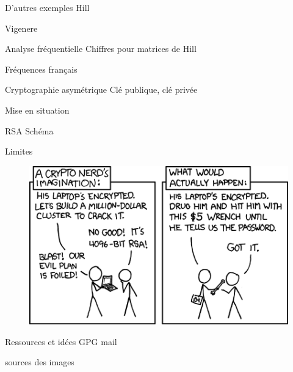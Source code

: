 \documentclass{beamer}
\begin{document}
\begin{frame}{D'autres exemples}
  Hill

  Vigenere
  \end{frame}

\begin{frame}{Analyse fréquentielle}
  Chiffres pour matrices de Hill

  Fréquences français
  \end{frame}


\begin{frame}{Cryptographie asymétrique}
  Clé publique, clé privée

  Mise en situation
\end{frame}

\begin{frame}{RSA}
  Schéma
  \end{frame}

\begin{frame}{Limites}
  \begin{figure}
    \centering
    \includegraphics[scale = 0.5]{xkcdsecurity.png}
  \end{figure}
\end{frame}

\begin{frame}{Ressources et idées}
  GPG mail
  
  sources des images
  \end{frame}
\end{document}
